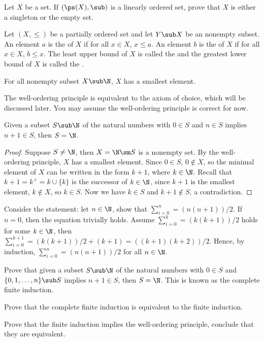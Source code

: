 \documentclass[10pt]{article}
\begin{document}
\begin{problem}
    Let $X$ be a set. If $(\ps(X),\sub)$ is a linearly ordered set, prove that $X$ is either a singleton or the empty set.
\end{problem}
\begin{definition}
    Let $(X,\le)$ be a partially ordered set and let $Y\sub X$ be an nonempty subset. An element $a$ is the  of $X$ if for all $x\in X$, $x\le a$. An element $b$ is the  of $X$ if for all $x\in X$, $b\le x$. The least upper bound of $X$ is called the  and the greatest lower bound of $X$ is called the .
\end{definition}
\begin{theorem}
    For all nonempty subset $X\sub\N$, $X$ has a smallest element.
\end{theorem}
\par
The well-ordering principle is equivalent to the axiom of choice, which will be discussed later. You may assume the well-ordering principle is correct for now. 
\begin{theorem}
    Given a subset $S\sub\N$ of the natural numbers with $0\in S$ and $n\in S$ implies $n+1\in S$, then $S=\N$.
\end{theorem}
\begin{proof}
    Suppose $S\ne\N$, then $X=\N\sm S$ is a nonempty set. By the well-ordering principle, $X$ has a smallest element. Since $0\in S$, $0\notin X$, so the minimal element of $X$ can be written in the form $k+1$, where $k\in\N$. Recall that $k+1={k}^{+}=k\cup\{k\}$ is the successor of $k\in\N$, since $k+1$ is the smallest element, $k\notin X$, so $k\in S$. Now we have $k\in S$ and $k+1\notin S$, a contradiction.
\end{proof}
\begin{example}
    Consider the statement: let $n\in\N$, show that ${\sum}_{i=0}^{n}=(n(n+1))/2$. If $n=0$, then the equation trivially holds. Assume ${\sum}_{i=0}^{k}=(k(k+1))/2$ holds for some $k\in\N$, then ${\sum}_{i=0}^{k+1}=(k(k+1))/2+(k+1)=((k+1)(k+2))/2$. Hence, by induction, ${\sum}_{i=0}^{n}=(n(n+1))/2$ for all $n\in\N$.
\end{example}
\begin{problem}
    Prove that given a subset $S\sub\N$ of the natural numbers with $0\in S$ and $\{0,1,\dots,n\}\sub S$ implies $n+1\in S$, then $S=\N$. This is known as the complete finite induction.
\end{problem}
\begin{problem}
    Prove that the complete finite induction is equivalent to the finite induction.
\end{problem}
\begin{problem}
    Prove that the finite induction implies the well-ordering principle, conclude that they are equivalent.
\end{problem}
\end{document}

